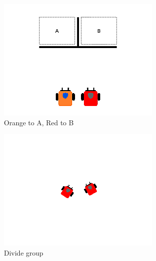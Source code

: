 \documentclass[]{article}
\begin{document}
\begin{figure}
\begin{subfigure}{0.42\textwidth}
		\includegraphics[width=\linewidth]{slide_images/Swarm_Robot_Control_-_Single_Robot_0011.png}
		\caption{Orange to A, Red to B}
		\label{fig:sub1}
	\end{subfigure}%
	\begin{subfigure}{0.42\textwidth}
		\centering
		\includegraphics[width=\linewidth]{slide_images/Swarm_Robot_Control_-_Single_Robot_0013.png}
		\caption{Divide group}
		\label{fig:sub2}
	\end{subfigure}
	\begin{subfigure}{0.42\textwidth}
		\centering

\end{subfigure}
\end{figure}
\end{document}

